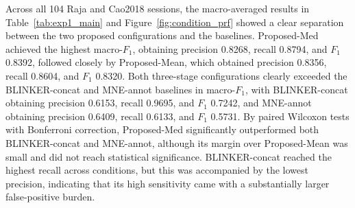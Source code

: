 Across all 104 Raja and Cao2018 sessions, the macro-averaged results in Table~\ref{tab:exp1_main} and Figure~\ref{fig:condition_prf} showed a clear separation between the two proposed configurations and the baselines. Proposed-Med achieved the highest macro-$F_1$, obtaining precision 0.8268, recall 0.8794, and $F_1$ 0.8392, followed closely by Proposed-Mean, which obtained precision 0.8356, recall 0.8604, and $F_1$ 0.8320. Both three-stage configurations clearly exceeded the BLINKER-concat and MNE-annot baselines in macro-$F_1$, with BLINKER-concat obtaining precision 0.6153, recall 0.9695, and $F_1$ 0.7242, and MNE-annot obtaining precision 0.6409, recall 0.6133, and $F_1$ 0.5731. By paired Wilcoxon tests with Bonferroni correction, Proposed-Med significantly outperformed both BLINKER-concat and MNE-annot, although its margin over Proposed-Mean was small and did not reach statistical significance. BLINKER-concat reached the highest recall across conditions, but this was accompanied by the lowest precision, indicating that its high sensitivity came with a substantially larger false-positive burden.
